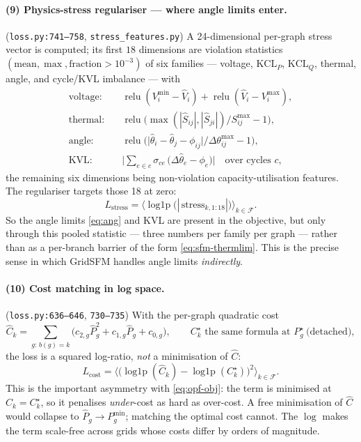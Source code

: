 \documentclass[11pt]{article}
\newcommand{\pred}[1]{\widehat{#1}}
\newcommand{\code}[1]{\texttt{\small #1}}
\newcommand{\relu}{\operatorname{relu}}
\newcommand{\logp}{\operatorname{log1p}}
\begin{document}
\paragraph{(9) Physics-stress regulariser --- where angle limits enter.}
(\code{loss.py:741--758}, \code{stress\_features.py}) A 24-dimensional per-graph stress
vector is computed; its first $18$ dimensions are violation statistics
$(\text{mean},\max,\text{fraction}>10^{-3})$ of six families --- voltage, $\mathrm{KCL}_P$,
$\mathrm{KCL}_Q$, thermal, angle, and cycle/KVL imbalance --- with
\begin{align}
\text{voltage:}\quad & \relu(V^{\min}_i-\pred{V}_i)+\relu(\pred{V}_i-V^{\max}_i),
\label{eq:sfm-stress-v}\\
\text{thermal:}\quad & \relu\!\big(\max(|\pred{S}_{ij}|,|\pred{S}_{ji}|)/S^{\max}_{ij}-1\big),
\label{eq:sfm-stress-t}\\
\text{angle:}\quad & \relu\!\Big(\big|\pred\theta_i-\pred\theta_j-\phi_{ij}\big|\big/\Delta\theta^{\max}_{ij}-1\Big),
\label{eq:sfm-stress-a}\\
\text{KVL:}\quad & \Big|\textstyle\sum_{e\in c}\sigma_{ce}\,\big(\Delta\pred\theta_e-\phi_e\big)\Big|
\quad\text{over cycles } c ,
\label{eq:sfm-stress-kvl}
\end{align}
the remaining six dimensions being non-violation capacity-utilisation features. The
regulariser targets those 18 at zero:
\begin{equation}
\boxed{\;
L_{\mathrm{stress}}
=\Big\langle \logp\!\big(|\,\mathrm{stress}_{k,1:18}|\big)\Big\rangle_{k\in\mathcal{F}} .
\;}
\label{eq:sfm-stress}
\end{equation}
So the angle limits \eqref{eq:ang} and KVL are present in the objective, but only through
this pooled statistic --- three numbers per family per graph --- rather than as a per-branch
barrier of the form \eqref{eq:sfm-thermlim}. This is the precise sense in which GridSFM
handles angle limits \emph{indirectly}.

\paragraph{(10) Cost matching in log space.}
(\code{loss.py:636--646}, \code{730--735}) With the per-graph quadratic cost
\begin{equation}
\pred{C}_k=\!\!\sum_{g:\,b(g)=k}\!\!\Big(c_{2,g}\pred{P}_g^2+c_{1,g}\pred{P}_g+c_{0,g}\Big),
\qquad
C^\star_k \text{ the same formula at } P^\star_g \ \text{(detached)},
\label{eq:sfm-cost-def}
\end{equation}
the loss is a squared log-ratio, \emph{not} a minimisation of $\pred{C}$:
\begin{equation}
\boxed{\;
L_{\mathrm{cost}}
=\Big\langle\Big(\logp(\pred{C}_k)-\logp(C^\star_k)\Big)^{2}\Big\rangle_{k\in\mathcal{F}} .
\;}
\label{eq:sfm-cost}
\end{equation}
This is the important asymmetry with \eqref{eq:opf-obj}: the term is minimised at
$\pred{C}_k=C^\star_k$, so it penalises \emph{under}-cost as hard as over-cost. A free
minimisation of $\pred{C}$ would collapse to $\pred{P}_g\to P^{\min}_g$; matching the
optimal cost cannot. The $\log$ makes the term scale-free across grids whose costs differ
by orders of magnitude.
\end{document}

